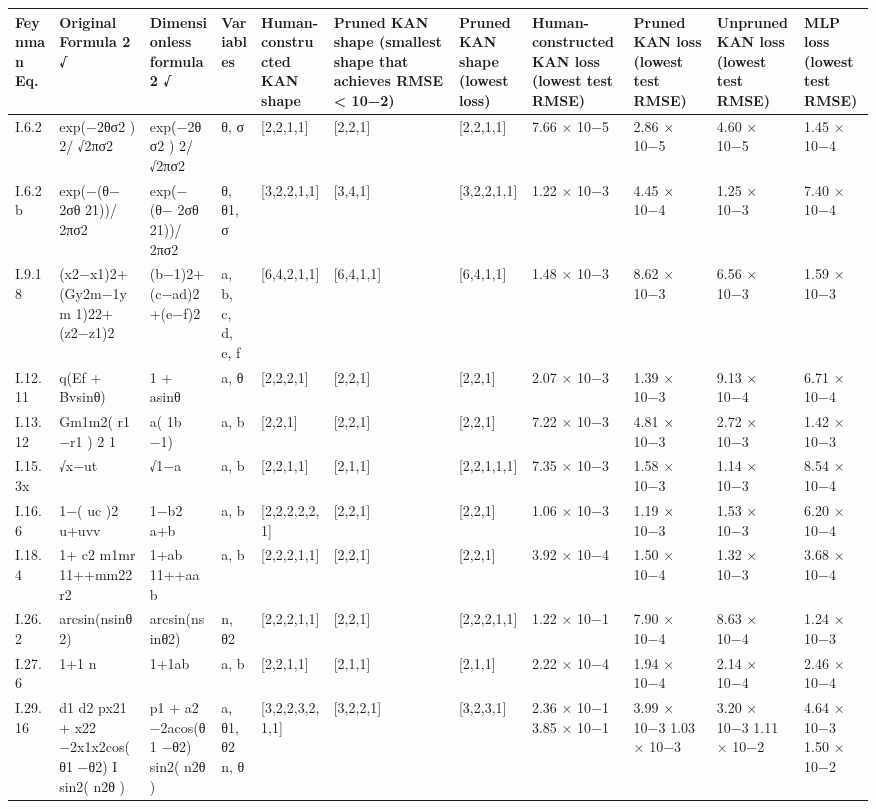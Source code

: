 \begin{tabular}{lllllllllll}
\toprule
Feynman Eq. & Original Formula 2 √ & Dimensionless formula 2 √ & Variables & Human-constructed KAN shape & Pruned KAN shape (smallest shape that achieves RMSE < 10−2) & Pruned KAN shape (lowest loss) & Human-constructed KAN loss (lowest test RMSE) & Pruned KAN loss (lowest test RMSE) & Unpruned KAN loss (lowest test RMSE) & MLP loss (lowest test RMSE) \\
\midrule
I.6.2 & exp(−2θσ2 ) 2/ √2πσ2 & exp(−2θσ2 ) 2/ √2πσ2 & θ, σ & [2,2,1,1] & [2,2,1] & [2,2,1,1] & 7.66 × 10−5 & 2.86 × 10−5 & 4.60 × 10−5 & 1.45 × 10−4 \\
I.6.2b & exp(−(θ− 2σθ 21))/ 2πσ2 & exp(−(θ− 2σθ 21))/ 2πσ2 & θ, θ1, σ & [3,2,2,1,1] & [3,4,1] & [3,2,2,1,1] & 1.22 × 10−3 & 4.45 × 10−4 & 1.25 × 10−3 & 7.40 × 10−4 \\
I.9.18 & (x2−x1)2+(Gy2m−1ym 1)22+(z2−z1)2 & (b−1)2+(c−ad)2+(e−f)2 & a, b, c, d, e, f & [6,4,2,1,1] & [6,4,1,1] & [6,4,1,1] & 1.48 × 10−3 & 8.62 × 10−3 & 6.56 × 10−3 & 1.59 × 10−3 \\
I.12.11 & q(Ef + Bvsinθ) & 1 + asinθ & a, θ & [2,2,2,1] & [2,2,1] & [2,2,1] & 2.07 × 10−3 & 1.39 × 10−3 & 9.13 × 10−4 & 6.71 × 10−4 \\
I.13.12 & Gm1m2( r1 −r1 ) 2 1 & a( 1b −1) & a, b & [2,2,1] & [2,2,1] & [2,2,1] & 7.22 × 10−3 & 4.81 × 10−3 & 2.72 × 10−3 & 1.42 × 10−3 \\
I.15.3x & √x−ut & √1−a & a, b & [2,2,1,1] & [2,1,1] & [2,2,1,1,1] & 7.35 × 10−3 & 1.58 × 10−3 & 1.14 × 10−3 & 8.54 × 10−4 \\
I.16.6 & 1−( uc )2 u+uvv & 1−b2 a+b & a, b & [2,2,2,2,2,1] & [2,2,1] & [2,2,1] & 1.06 × 10−3 & 1.19 × 10−3 & 1.53 × 10−3 & 6.20 × 10−4 \\
I.18.4 & 1+ c2 m1mr 11++mm22r2 & 1+ab 11++aab & a, b & [2,2,2,1,1] & [2,2,1] & [2,2,1] & 3.92 × 10−4 & 1.50 × 10−4 & 1.32 × 10−3 & 3.68 × 10−4 \\
I.26.2 & arcsin(nsinθ2) & arcsin(nsinθ2) & n, θ2 & [2,2,2,1,1] & [2,2,1] & [2,2,2,1,1] & 1.22 × 10−1 & 7.90 × 10−4 & 8.63 × 10−4 & 1.24 × 10−3 \\
I.27.6 & 1+1 n & 1+1ab & a, b & [2,2,1,1] & [2,1,1] & [2,1,1] & 2.22 × 10−4 & 1.94 × 10−4 & 2.14 × 10−4 & 2.46 × 10−4 \\
I.29.16 & d1 d2 px21 + x22 −2x1x2cos(θ1 −θ2) I sin2( n2θ ) & p1 + a2 −2acos(θ1 −θ2) sin2( n2θ ) & a, θ1, θ2 n, θ & [3,2,2,3,2,1,1] & [3,2,2,1] & [3,2,3,1] & 2.36 × 10−1 3.85 × 10−1 & 3.99 × 10−3 1.03 × 10−3 & 3.20 × 10−3 1.11 × 10−2 & 4.64 × 10−3 1.50 × 10−2 \\

\end{tabular}
